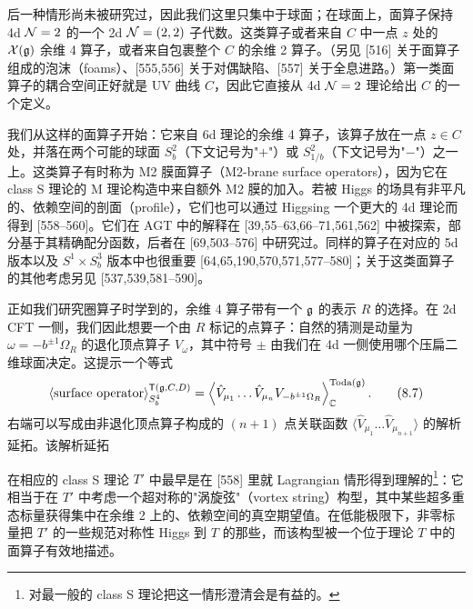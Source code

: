 后一种情形尚未被研究过，因此我们这里只集中于球面；在球面上，面算子保持 4d $\mathcal{N}=2$ 的一个 2d $\mathcal{N}=(2,2)$ 子代数。这类算子或者来自 $C$ 中一点 $z$ 处的 $\mathcal{X}(\mathfrak{g})$ 余维 4 算子，或者来自包裹整个 $C$ 的余维 2 算子。（另见 [516] 关于面算子组成的泡沫（foams）、[555,556] 关于对偶缺陷、[557] 关于全息进路。）第一类面算子的耦合空间正好就是 UV 曲线 $C$，因此它直接从 4d $\mathcal{N}=2$ 理论给出 $C$ 的一个定义。

 我们从这样的面算子开始：它来自 6d 理论的余维 4 算子，该算子放在一点 $z\in C$ 处，并落在两个可能的球面 $S^2_b$（下文记号为"$+$"）或 $S^2_{1/b}$（下文记号为"$-$"）之一上。这类算子有时称为 M2 膜面算子（M2-brane surface operators），因为它在 class S 理论的 M 理论构造中来自额外 M2 膜的加入。若被 Higgs 的场具有非平凡的、依赖空间的剖面（profile），它们也可以通过 Higgsing 一个更大的 4d 理论而得到 [558--560]。它们在 AGT 中的解释在 [39,55--63,66--71,561,562] 中被探索，部分基于其精确配分函数，后者在 [69,503--576] 中研究过。同样的算子在对应的 5d 版本以及 $S^1\times S^3_b$ 版本中也很重要 [64,65,190,570,571,577--580]；关于这类面算子的其他考虑另见 [537,539,581--590]。

正如我们研究圈算子时学到的，余维 4 算子带有一个 $\mathfrak{g}$ 的表示 $R$ 的选择。在 2d CFT 一侧，我们因此想要一个由 $R$ 标记的点算子：自然的猜测是动量为 $\omega=-b^{\pm1}\Omega_R$ 的退化顶点算子 $V_\omega$，其中符号 $\pm$ 由我们在 4d 一侧使用哪个压扁二维球面决定。这提示一个等式
\begin{equation}
    \left\langle\text{surface operator}\right\rangle^{\mathsf{T}(\mathfrak{g},C,D)}_{S^4_b}
    =\left\langle\hat V_{\mu_1}\ldots\hat V_{\mu_n}V_{-b^{\pm1}\Omega_R}\right\rangle^{\mathrm{Toda}(\mathfrak{g})}_{\mathbb{C}}.
    \tag{8.7}
\end{equation}
右端可以写成由非退化顶点算子构成的 $(n+1)$ 点关联函数 $\langle\hat V_{\mu_1}\ldots\hat V_{\mu_{n+1}}\rangle$ 的解析延拓。该解析延拓

在相应的 class S 理论 $T'$ 中最早是在 [558] 里就 Lagrangian 情形得到理解的\footnote{对最一般的 class S 理论把这一情形澄清会是有益的。}：它相当于在 $T'$ 中考虑一个超对称的"涡旋弦"（vortex string）构型，其中某些超多重态标量获得集中在余维 2 上的、依赖空间的真空期望值。在低能极限下，非零标量把 $T'$ 的一些规范对称性 Higgs 到 $T$ 的那些，而该构型被一个位于理论 $T$ 中的面算子有效地描述。

